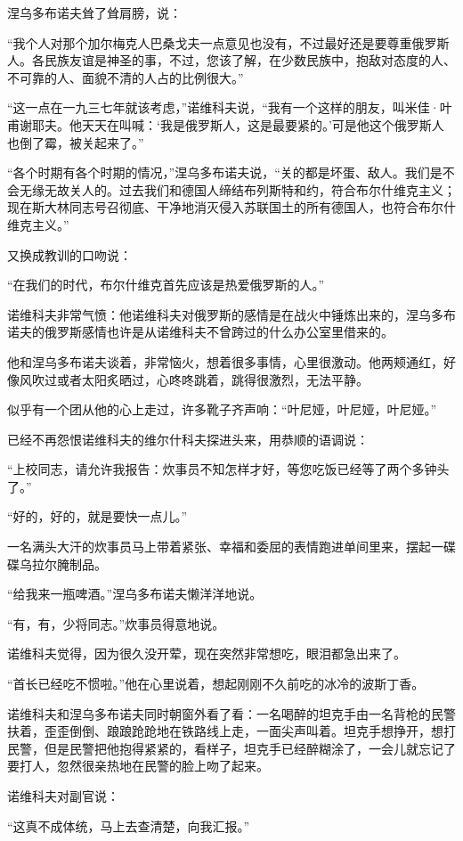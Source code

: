 涅乌多布诺夫耸了耸肩膀，说：

“我个人对那个加尔梅克人巴桑戈夫一点意见也没有，不过最好还是要尊重俄罗斯人。各民族友谊是神圣的事，不过，您该了解，在少数民族中，抱敌对态度的人、不可靠的人、面貌不清的人占的比例很大。”

“这一点在一九三七年就该考虑，”诺维科夫说，“我有一个这样的朋友，叫米佳·叶甫谢耶夫。他天天在叫喊：‘我是俄罗斯人，这是最要紧的。’可是他这个俄罗斯人也倒了霉，被关起来了。”

“各个时期有各个时期的情况，”涅乌多布诺夫说，“关的都是坏蛋、敌人。我们是不会无缘无故关人的。过去我们和德国人缔结布列斯特和约，符合布尔什维克主义；现在斯大林同志号召彻底、干净地消灭侵入苏联国土的所有德国人，也符合布尔什维克主义。”

又换成教训的口吻说：

“在我们的时代，布尔什维克首先应该是热爱俄罗斯的人。”

诺维科夫非常气愤：他诺维科夫对俄罗斯的感情是在战火中锤炼出来的，涅乌多布诺夫的俄罗斯感情也许是从诺维科夫不曾跨过的什么办公室里借来的。

他和涅乌多布诺夫谈着，非常恼火，想着很多事情，心里很激动。他两颊通红，好像风吹过或者太阳炙晒过，心咚咚跳着，跳得很激烈，无法平静。

似乎有一个团从他的心上走过，许多靴子齐声响：“叶尼娅，叶尼娅，叶尼娅。”

已经不再怨恨诺维科夫的维尔什科夫探进头来，用恭顺的语调说：

“上校同志，请允许我报告：炊事员不知怎样才好，等您吃饭已经等了两个多钟头了。”

“好的，好的，就是要快一点儿。”

一名满头大汗的炊事员马上带着紧张、幸福和委屈的表情跑进单间里来，摆起一碟碟乌拉尔腌制品。

“给我来一瓶啤酒。”涅乌多布诺夫懒洋洋地说。

“有，有，少将同志。”炊事员得意地说。

诺维科夫觉得，因为很久没开荤，现在突然非常想吃，眼泪都急出来了。

“首长已经吃不惯啦。”他在心里说着，想起刚刚不久前吃的冰冷的波斯丁香。

诺维科夫和涅乌多布诺夫同时朝窗外看了看：一名喝醉的坦克手由一名背枪的民警扶着，歪歪倒倒、踉踉跄跄地在铁路线上走，一面尖声叫着。坦克手想挣开，想打民警，但是民警把他抱得紧紧的，看样子，坦克手已经醉糊涂了，一会儿就忘记了要打人，忽然很亲热地在民警的脸上吻了起来。

诺维科夫对副官说：

“这真不成体统，马上去查清楚，向我汇报。”

